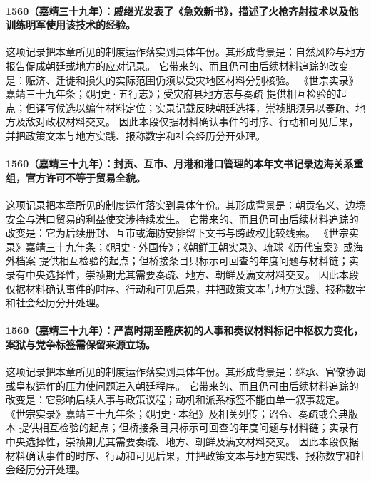 \paragraph{1560（嘉靖三十九年）：戚继光发表了《急效新书》，描述了火枪齐射技术以及他训练明军使用该技术的经验。} 这项记录把本章所见的制度运作落实到具体年份。其形成背景是：自然风险与地方报告促成朝廷或地方的应对记录。 它带来的、而且仍可由后续材料追踪的改变是：赈济、迁徙和损失的实际范围仍须以受灾地区材料分别核验。 《世宗实录》嘉靖三十九年条；《明史·五行志》；受灾府县地方志与奏疏 提供相互检验的起点；但译写候选以编年材料定位；实录记载反映朝廷选择，崇祯期须另以奏疏、地方及敌对政权材料交叉。 因此本段仅据材料确认事件的时序、行动和可见后果，并把政策文本与地方实践、报称数字和社会经历分开处理。

\paragraph{1560（嘉靖三十九年）：封贡、互市、月港和港口管理的本年文书记录边海关系重组，官方许可不等于贸易全貌。} 这项记录把本章所见的制度运作落实到具体年份。其形成背景是：朝贡名义、边境安全与港口贸易的利益使交涉持续发生。 它带来的、而且仍可由后续材料追踪的改变是：它为后续册封、互市或海防安排留下文书与跨政权比较线索。 《世宗实录》嘉靖三十九年条；《明史·外国传》；《朝鲜王朝实录》、琉球《历代宝案》或海外档案 提供相互检验的起点；但桥接条目只标示可回查的年度问题与材料链；实录有中央选择性，崇祯期尤其需要奏疏、地方、朝鲜及满文材料交叉。 因此本段仅据材料确认事件的时序、行动和可见后果，并把政策文本与地方实践、报称数字和社会经历分开处理。

\paragraph{1560（嘉靖三十九年）：严嵩时期至隆庆初的人事和奏议材料标记中枢权力变化，案狱与党争标签需保留来源立场。} 这项记录把本章所见的制度运作落实到具体年份。其形成背景是：继承、官僚协调或皇权运作的压力使问题进入朝廷程序。 它带来的、而且仍可由后续材料追踪的改变是：它影响后续人事与政策议程；动机和派系标签不能由单一叙事裁定。 《世宗实录》嘉靖三十九年条；《明史·本纪》及相关列传；诏令、奏疏或会典版本 提供相互检验的起点；但桥接条目只标示可回查的年度问题与材料链；实录有中央选择性，崇祯期尤其需要奏疏、地方、朝鲜及满文材料交叉。 因此本段仅据材料确认事件的时序、行动和可见后果，并把政策文本与地方实践、报称数字和社会经历分开处理。

